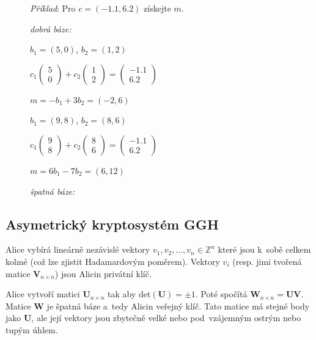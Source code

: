 \begin{figure}[ht]
    \emph{Příklad}: Pro $c = (-1.1, 6.2)$ získejte $m$.

    \begin{minipage}{0.5\textwidth}
        \centering
        \caption*{\emph{dobrá báze:}}

        $b_1 = (5, 0)$, $b_2 = (1, 2)$

        $c_1\left(\begin{matrix}5\\0\end{matrix}\right) + c_2 \left(\begin{matrix}1\\2\end{matrix}\right) = \left(\begin{matrix}-1.1\\6.2\end{matrix}\right)$

        $m = -b_1 + 3b_2 = (-2, 6)$
    \end{minipage}\hfill\begin{minipage}{0.5\textwidth}
        \centering
        \caption*{\emph{špatná báze:}}

        $b_1 = (9, 8)$, $b_2 = (8, 6)$

        $c_1\left(\begin{matrix}9\\8\end{matrix}\right) + c_2 \left(\begin{matrix}8\\6\end{matrix}\right) = \left(\begin{matrix}-1.1\\6.2\end{matrix}\right)$

        $m = 6b_1 - 7b_2 = (6, 12)$
    \end{minipage}
\end{figure}


\subsection{Asymetrický kryptosystém GGH}

Alice vybírá lineárně nezávislé vektory $v_1, v_2, \dots, v_n \in \mathbb{Z}^n$ které jsou k~sobě celkem kolmé (což lze zjistit Hadamardovým poměrem).
Vektory $v_i$ (resp. jimi tvořená matice $\textbf{V}_{n \times n}$) jsou Alicin privátní klíč.

Alice vytvoří matici $\textbf{U}_{n \times n}$ tak aby $\text{det}(\textbf{U}) = \pm 1$.
Poté spočítá $\textbf{W}_{n \times n} = \textbf{UV}$.
Matice $\textbf{W}$ je špatná báze a~tedy Alicin veřejný klíč.
Tato matice má stejné body jako \textbf{U}, ale její vektory jsou zbytečně velké nebo pod~vzájemným ostrým nebo tupým úhlem.

